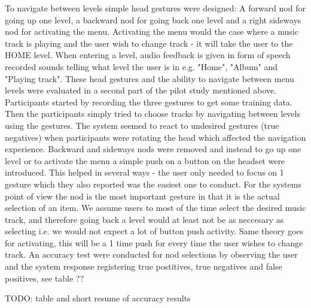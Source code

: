 To navigate between levels simple head gestures were designed: A forward nod for going up one level, a backward nod for going back one level and a right sideways nod for activating the menu. Activating the menu would the case where a music track is playing and the user wish to change track - it will take the user to the HOME level. When entering a level, audio feedback is given in form of speech recorded sounds telling what level the user is in e.g. "Home", "Album" and "Playing track". These head gestures and the ability to navigate between menu levels were evaluated in a second part of the pilot study mentioned above. Participants started by recording the three gestures to get some training data. Then the participants simply tried to choose tracks by navigating between levels using the gestures. The system seemed to react to undesired gestures (true negatives) when participants were rotating the head which affected the navigation experience. Backward and sideways nods were removed and instead to go up one level or to activate the menu a simple push on a button on the headset were introduced. This helped in several ways - the user only needed to focus on 1 gesture which they also reported was the easiest one to conduct. For the systems point of view the nod is the most important gesture in that it is the actual selection of an item. We assume users to most of the time select the desired music track, and therefore going back a level would at least not be as neccesary as selecting i.e. we would not expect a lot of button push activity. Same theory goes for activating, this will be a 1 time push for every time the user wishes to change track. An accuracy test were conducted for nod selections by observing the user and the system response registering true postitives, true negatives and false positives, see table ??

TODO: table and short resume of accuracy results
























